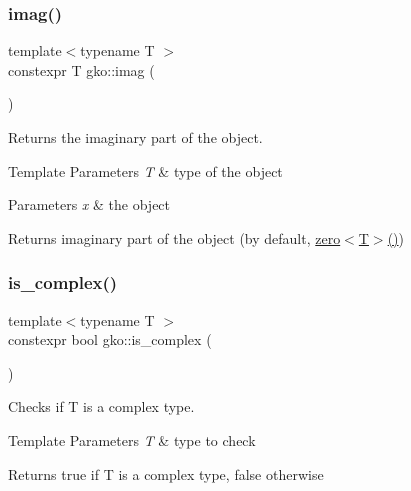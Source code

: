 \subsubsection{\texorpdfstring{imag()}{imag()}}
{\footnotesize\ttfamily template$<$typename T $>$ \\
constexpr T gko\+::imag (\begin{DoxyParamCaption}\item[{const T \&}]{ }\end{DoxyParamCaption})\hspace{0.3cm}{\ttfamily [inline]}}



Returns the imaginary part of the object. 


\begin{DoxyTemplParams}{Template Parameters}
{\em T} & type of the object\\
\hline
\end{DoxyTemplParams}

\begin{DoxyParams}{Parameters}
{\em x} & the object\\
\hline
\end{DoxyParams}
\begin{DoxyReturn}{Returns}
imaginary part of the object (by default, \hyperlink{namespacegko_a70dbe01ff95c7b953d3d737424c6feb5}{zero$<$\+T$>$()}) 
\end{DoxyReturn}
\mbox{\label{namespacegko_a9b3e79911bb6145d7ba865dbe436b915}} 
\subsubsection{\texorpdfstring{is\+\_\+complex()}{is\_complex()}}
{\footnotesize\ttfamily template$<$typename T $>$ \\
constexpr bool gko\+::is\+\_\+complex (\begin{DoxyParamCaption}{ }\end{DoxyParamCaption})\hspace{0.3cm}{\ttfamily [inline]}}



Checks if T is a complex type. 


\begin{DoxyTemplParams}{Template Parameters}
{\em T} & type to check\\
\hline
\end{DoxyTemplParams}
\begin{DoxyReturn}{Returns}
{\ttfamily true} if T is a complex type, {\ttfamily false} otherwise 
\end{DoxyReturn}
\mbox{\label{namespacegko_aa8cb4876b72e5e1036ea9575443c439b}} 
